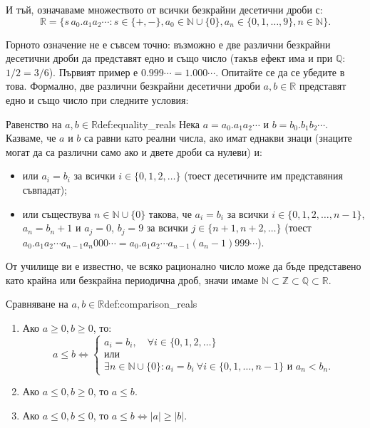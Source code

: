 И тъй, означаваме множеството от всички безкрайни десетични дроби с:
\[
\mathbb{R} = \{ s\, a_0.a_1a_2\cdots : s \in \{+, -\}, a_0 \in \mathbb{N} \cup \{0\}, a_n \in \{0, 1, \dots, 9\}, n \in \mathbb{N} \}.
\]

Горното означение не е съвсем точно: възможно е две различни безкрайни десетични дроби да представят едно и също число (такъв ефект има и при $\mathbb{Q}$: $1/2 = 3/6$). Първият пример е $0.999\cdots = 1.000\cdots$. Опитайте се да се убедите в това. Формално, две различни безкрайни десетични дроби $a, b \in \mathbb{R}$ представят едно и също число при следните условия:

\begin{definition}{Равенство на $a, b \in \mathbb{R}$}{def:equality_reals}
Нека $a = a_0.a_1a_2\cdots$ и $b = b_0.b_1b_2\cdots$. Казваме, че $a$ и $b$ са равни като реални числа, ако имат еднакви знаци (знаците могат да са различни само ако и двете дроби са нулеви) и:
\begin{itemize}
    \item или $a_i = b_i$ за всички $i \in \{0, 1, 2, \dots\}$ (тоест десетичните им представяния съвпадат);
    \item или съществува $n \in \mathbb{N} \cup \{0\}$ такова, че $a_i = b_i$ за всички $i \in \{0, 1, 2, \dots, n - 1\}$, $a_n = b_n + 1$ и $a_j = 0$, $b_j = 9$ за всички $j \in \{n + 1, n + 2, \dots\}$ (тоест $a_0.a_1a_2\cdots a_{n-1}a_n 000\cdots = a_0.a_1a_2\cdots a_{n-1}(a_n - 1)999\cdots$).
\end{itemize}
\end{definition}

От училище ви е известно, че всяко рационално число може да бъде представено като крайна или безкрайна периодична дроб, значи имаме $\mathbb{N} \subset \mathbb{Z} \subset \mathbb{Q} \subset \mathbb{R}$.

\begin{definition}{Сравняване на $a, b \in \mathbb{R}$}{def:comparison_reals}
\begin{enumerate}
    \item Ако $a \ge 0, b \ge 0$, то:
    \[
    a \le b \iff
    \begin{cases}
    a_i = b_i, \quad \forall i \in \{0, 1, 2, \dots\} \\
    \text{или} \\
    \exists n \in \mathbb{N} \cup \{0\} : a_i = b_i \ \forall i \in \{0, 1, \dots, n - 1\} \text{ и } a_n < b_n.
    \end{cases}
    \]
    \item Ако $a \le 0, b \ge 0$, то $a \le b$.
    \item Ако $a \le 0, b \le 0$, то $a \le b \iff |a| \ge |b|$.
\end{enumerate}
\end{definition}

